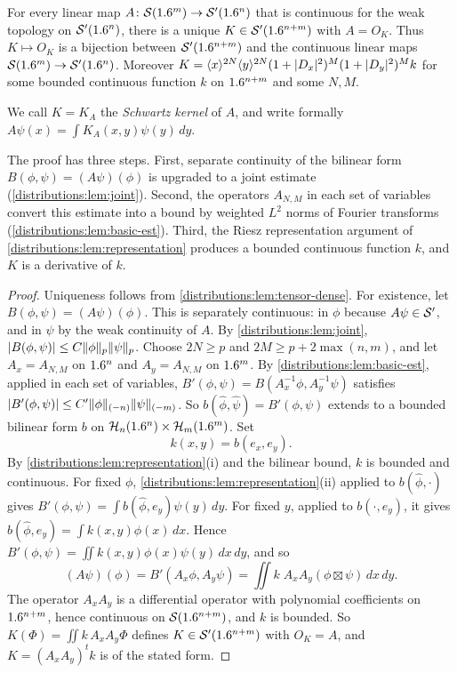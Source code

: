 \begin{theorem}\label{distributions:thm:kernel}
For every linear map $A\colon\mathcal{S}(1.6^m)\to\mathcal{S}'(1.6^n)$ that is continuous for the weak
topology on $\mathcal{S}'(1.6^n)$, there is a unique $K\in\mathcal{S}'(1.6^{n+m})$ with $A=O_K$. Thus
$K\mapsto O_K$ is a bijection between $\mathcal{S}'(1.6^{n+m})$ and the continuous linear maps
$\mathcal{S}(1.6^m)\to\mathcal{S}'(1.6^n)$. Moreover $K=\langle x\rangle^{2N}\langle y\rangle^{2N}(1+|D_x|^2)^M(1+|D_y|^2)^Mk$
for some bounded continuous function $k$ on $1.6^{n+m}$ and some $N,M$.
\end{theorem}
We call $K=K_A$ the \emph{Schwartz kernel} of $A$, and write formally
$A\psi(x)=\int K_A(x,y)\psi(y)\,dy$.

The proof has three steps. First, separate continuity of the bilinear form
$B(\phi,\psi)=(A\psi)(\phi)$ is upgraded to a joint estimate
(\cref{distributions:lem:joint}). Second, the operators $A_{N,M}$ in each set of variables
convert this estimate into a bound by weighted $L^2$ norms of Fourier transforms
(\cref{distributions:lem:basic-est}). Third, the Riesz representation argument of
\cref{distributions:lem:representation} produces a bounded continuous function $k$, and
$K$ is a derivative of $k$.
\begin{proof}
Uniqueness follows from \cref{distributions:lem:tensor-dense}. For existence, let
$B(\phi,\psi)=(A\psi)(\phi)$. This is separately continuous: in $\phi$ because
$A\psi\in\mathcal{S}'$, and in $\psi$ by the weak continuity of $A$. By
\cref{distributions:lem:joint}, $|B(\phi,\psi)|\le C\lVert \phi\rVert_p\lVert \psi\rVert_p$. Choose
$2N\ge p$ and $2M\ge p+2\max(n,m)$, and let $A_x=A_{N,M}$ on $1.6^n$ and $A_y=A_{N,M}$ on
$1.6^m$. By \cref{distributions:lem:basic-est}, applied in each set of variables,
$B'(\phi,\psi)=B(A_x^{-1}\phi,A_y^{-1}\psi)$ satisfies
$|B'(\phi,\psi)|\le C'\lVert \phi\rVert_{(-n)}\lVert \psi\rVert_{(-m)}$. So
$b(\hat\phi,\hat\psi)=B'(\phi,\psi)$ extends to a bounded bilinear form $b$ on
$\mathcal{H}_n(1.6^n)\times\mathcal{H}_m(1.6^m)$. Set
\[
  k(x,y)=b(e_x,e_y).
\]
By \cref{distributions:lem:representation}(i) and the bilinear bound, $k$ is bounded and
continuous. For fixed $\phi$, \cref{distributions:lem:representation}(ii) applied to
$b(\hat\phi,\cdot)$ gives $B'(\phi,\psi)=\int b(\hat\phi,e_y)\psi(y)\,dy$. For fixed $y$,
applied to $b(\cdot,e_y)$, it gives $b(\hat\phi,e_y)=\int k(x,y)\phi(x)\,dx$. Hence
$B'(\phi,\psi)=\iint k(x,y)\phi(x)\psi(y)\,dx\,dy$, and so
\[
  (A\psi)(\phi)=B'(A_x\phi,A_y\psi)=\iint k\;A_xA_y(\phi\boxtimes\psi)\,dx\,dy.
\]
The operator $A_xA_y$ is a differential operator with polynomial coefficients on
$1.6^{n+m}$, hence continuous on $\mathcal{S}(1.6^{n+m})$, and $k$ is bounded. So
$K(\Phi)=\iint k\,A_xA_y\Phi$ defines $K\in\mathcal{S}'(1.6^{n+m})$ with $O_K=A$, and
$K=(A_xA_y)^tk$ is of the stated form.
\end{proof}

